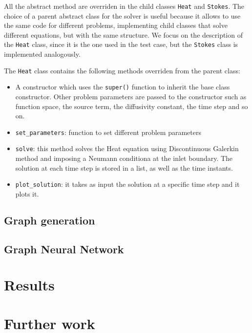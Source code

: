\documentclass[11pt,a4paper]{article}
\begin{document}
All the abstract method are overriden in the child classes \texttt{Heat} and 
\texttt{Stokes}. The choice of a parent abstract class for the solver is useful 
because it allows to use the same code for different problems, implementing
child classes that solve different equations, but with the same structure. 
We focus on the description of the \texttt{Heat} class, since it is the one used in 
the test case, but the \texttt{Stokes} class is implemented analogously.

The \texttt{Heat} class contains the following methods overriden from the parent class:
\begin{itemize}
    \item A constructor which uses the \texttt{super()} function to inherit the base 
    class constructor. Other problem parameters are passed to the constructor such as
    function space, the source term, the diffusivity constant, the time step and so on. 
    \item \texttt{set\_parameters}: function to set different problem parameters
    \item \texttt{solve}: this method solves the Heat equation using Discontinuous
    Galerkin method and imposing a Neumann conditiona at the inlet boundary. The solution
    at each time step is stored in a list, as well as the time instants. 
    \item \texttt{plot\_solution}: it takes as input the solution at a specific time 
    step and it plots it.
\end{itemize}

\subsection{Graph generation}

\subsection{Graph Neural Network}


\section{Results}


\section{Further work}

\newpage
\end{document}
